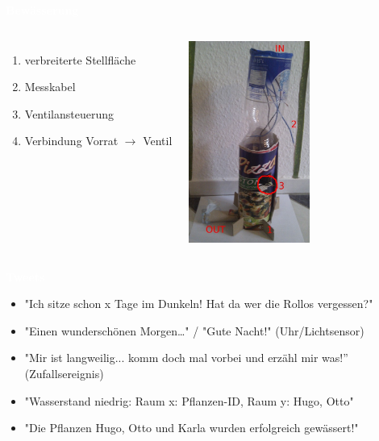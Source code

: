 \documentclass[bigger]{beamer}
\newcommand{\topic}[1]{{\huge{\textcolor{white}{\textbf{#1}}}}}
\begin{document}
\begin{frame}{\topic{Bewässerung}}
    \begin{columns}
        \begin{enumerate}
			\item verbreiterte Stellfläche
			\item Messkabel
			\item Ventilansteuerung
			\item Verbindung Vorrat $\rightarrow$ Ventil
        \end{enumerate}
        \includegraphics[width=150px]{System.jpg}
    \end{columns}
\end{frame} 

\begin{frame}{\topic{Tweets}}
	\begin{itemize}
		\item "Ich sitze schon x Tage im Dunkeln! Hat da wer die Rollos vergessen?"
		\item "Einen wunderschönen Morgen…" / "Gute Nacht!" (Uhr/Lichtsensor)
		\item "Mir ist langweilig... komm doch mal vorbei und erzähl mir was!” (Zufallsereignis)
		\item "Wasserstand niedrig: Raum x: Pflanzen-ID, Raum y: Hugo, Otto"
		\item "Die Pflanzen Hugo, Otto und Karla wurden erfolgreich gewässert!"
	\end{itemize}
\end{frame}
\end{document}
